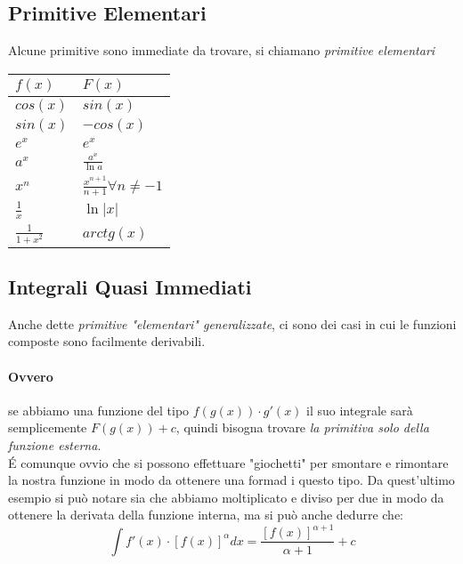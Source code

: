 \subsection{Primitive Elementari}
Alcune primitive sono immediate da trovare, si chiamano \emph{primitive elementari}\\
\begin{center}
	\begin{tabularx}{0.5\textwidth}{|X|X|}
		\hline
		$f(x)$            & $F(x)$                                  \\
		\hline
		\hline
		$cos(x)$          & $sin(x)$                                \\
		\hline
		$sin(x)$          & $-cos(x)$                               \\
		\hline
		$e^x$             & $e^x$                                   \\
		\hline
		$a^x$             & $\frac{a^x}{\ln a} $                    \\
		\hline
		$x^n$             & $\frac{x^{n+1}}{n+1} \forall n\neq -1 $ \\
		\hline
		$\frac{1}{x}$     & $\ln |x| $                              \\
		\hline
		$\frac{1}{1+x^2}$ & $arctg(x) $                             \\
		\hline
	\end{tabularx}
\end{center}


\subsection{Integrali Quasi Immediati}

Anche dette \emph{primitive "elementari" generalizzate}, ci sono dei casi in cui le funzioni composte sono facilmente derivabili.

\paragraph*{Ovvero} se abbiamo una funzione del tipo $f(g(x)) \cdot g'(x)$ il suo integrale sarà semplicemente $F(g(x)) + c$, quindi bisogna trovare \emph{la primitiva solo della funzione esterna}.
\\\'E comunque ovvio che si possono effettuare "giochetti" per smontare e rimontare la nostra funzione in modo da ottenere una formad i questo tipo.
Da quest'ultimo esempio si può notare sia che abbiamo moltiplicato e diviso per due in modo da ottenere la derivata della funzione interna,
ma si può anche dedurre che:
$$
\int f'(x) \cdot [ f(x)]^\alpha dx = \frac{[f(x)]^{\alpha+1}}{\alpha + 1} + c
$$


